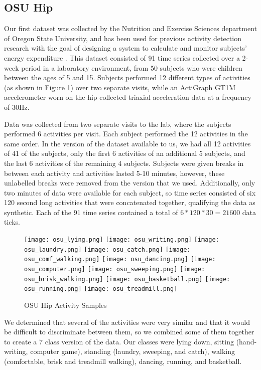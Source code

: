 \subsection{OSU Hip}
Our first dataset was collected by the Nutrition and Exercise Sciences department of
Oregon State University, and has been used for previous activity detection research
with the goal of designing a system to calculate and monitor subjects' energy expenditure
\cite{trost12} \cite{zheng12}.
This dataset consisted of 91 time series collected over a 2-week period in a
laboratory environment, from 50 subjects who were children between the ages of 5 and 15.
Subjects performed 12 different types of activities (as shown in Figure \ref{fig:osu_activities})
over two separate visits, while an ActiGraph GT1M accelerometer worn on the hip 
collected triaxial acceleration data at a frequency of 30Hz.

Data was collected from two separate visits to the lab, where the subjects performed 6 activities per visit.
Each subject performed the 12 activities in the same order.
In the version of the dataset available to us, we had all 12 activities of
41 of the subjects, only the first 6 activities of an additional 5 subjects,
and the last 6 activities of the remaining 4 subjects.
Subjects were given breaks in between each activity and activities lasted 5-10
minutes, however, these unlabelled breaks were removed from the version that we
used. Additionally, only two minutes of data were available for each subject, so 
time series consisted of six 120 second long activities that were concatenated together,
qualifying the data as synthetic. Each of the 91 time series contained a total of
$6*120*30 = 21600$ data ticks.

\begin{figure}
 \centering
 \texttt{[image: osu\_lying.png]}
 \texttt{[image: osu\_writing.png]}
 \texttt{[image: osu\_laundry.png]}
 \texttt{[image: osu\_catch.png]}
 \texttt{[image: osu\_comf\_walking.png]}
 \texttt{[image: osu\_dancing.png]}
 \texttt{[image: osu\_computer.png]}
 \texttt{[image: osu\_sweeping.png]}
 \texttt{[image: osu\_brisk\_walking.png]}
 \texttt{[image: osu\_basketball.png]}
 \texttt{[image: osu\_running.png]}
 \texttt{[image: osu\_treadmill.png]}
 \caption{OSU Hip Activity Samples}
 \label{fig:osu_activities}
\end{figure}

We determined that several of the activities were very similar and that
it would be difficult to discriminate between them, so we combined some of them together to
create a 7 class version of the data.
Our classes were lying down, sitting (hand-writing, computer game),
standing (laundry, sweeping, and catch), walking (comfortable, brisk and treadmill walking),
dancing, running, and basketball.

